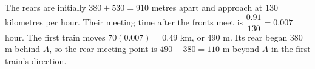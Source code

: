 The rears are initially $380+530=910$ metres apart and approach at $130$ kilometres per hour. Their meeting time after the fronts meet is $\dfrac{0.91}{130}=0.007$ hour. The first train moves $70(0.007)=0.49$ km, or $490$ m. Its rear began $380$ m behind $A$, so the rear meeting point is $490-380=\boxed{110\text{ m}}$ beyond $A$ in the first train's direction.
